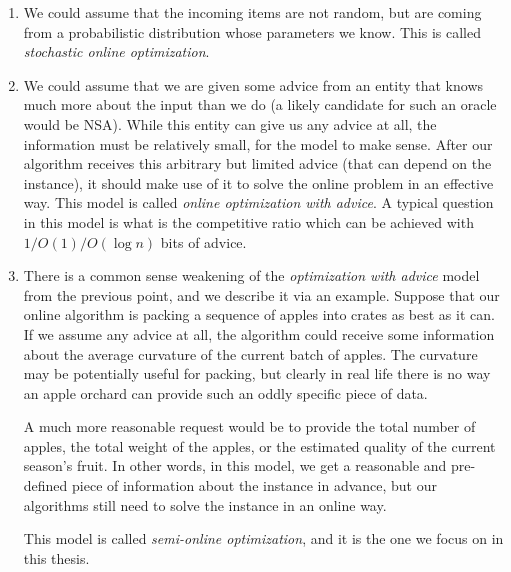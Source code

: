 \begin{enumerate}

\item We could assume that the incoming items are not random, but
are coming from a probabilistic distribution whose parameters we know.
This is called \textit{stochastic online optimization}.

\item We could assume that we are given some advice from an entity
that knows much more about the input than we do (a likely candidate
for such an oracle would be NSA). While this entity can give us any
advice at all, the information must be relatively small, for the model
to make sense. After our algorithm receives this arbitrary but limited
advice (that can depend on the instance), it should make use of it to
solve the online problem in an effective way. This model is called
\textit{online optimization with advice}. A typical question in this
model is what is the competitive ratio which can be achieved with $1/
O(1) / O(\log n)$ bits of advice.

\item There is a common sense weakening of the \textit{optimization
with advice} model from the previous point, and we describe it
via an example. Suppose that our online algorithm is packing a
sequence of apples into crates as best as it can. If we assume any
advice at all, the algorithm could receive some information about the
average curvature of the current batch of apples. The curvature may
be potentially useful for packing, but clearly in real life there is no
way an apple orchard can provide such an oddly specific piece of data.

A much more reasonable request would be to provide the total number of
apples, the total weight of the apples, or the estimated quality of
the current season's fruit. In other words, in this model, we get a
reasonable and pre-defined piece of information about the instance in
advance, but our algorithms still need to solve the instance in an
online way.

This model is called \textit{semi-online optimization}, and it is the
one we focus on in this thesis.


\end{enumerate}